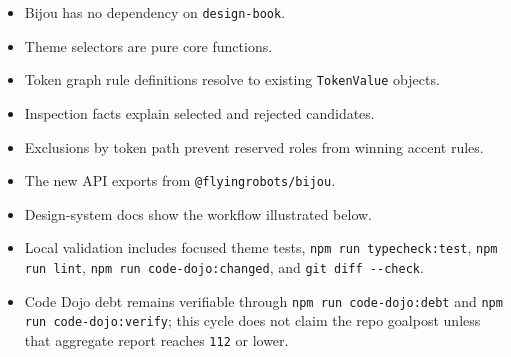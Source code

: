 \begin{itemize}
\tightlist
\item
  Bijou has no dependency on \texttt{d\allowbreak{}e\allowbreak{}s\allowbreak{}i\allowbreak{}g\allowbreak{}n\allowbreak{}-\allowbreak{}b\allowbreak{}o\allowbreak{}o\allowbreak{}k}.
\item
  Theme selectors are pure core functions.
\item
  Token graph rule definitions resolve to existing \texttt{T\allowbreak{}o\allowbreak{}k\allowbreak{}e\allowbreak{}n\allowbreak{}V\allowbreak{}a\allowbreak{}l\allowbreak{}u\allowbreak{}e} objects.
\item
  Inspection facts explain selected and rejected candidates.
\item
  Exclusions by token path prevent reserved roles from winning accent rules.
\item
  The new API exports from \texttt{@\allowbreak{}f\allowbreak{}l\allowbreak{}y\allowbreak{}i\allowbreak{}n\allowbreak{}g\allowbreak{}r\allowbreak{}o\allowbreak{}b\allowbreak{}o\allowbreak{}t\allowbreak{}s\allowbreak{}/\allowbreak{}b\allowbreak{}i\allowbreak{}j\allowbreak{}o\allowbreak{}u}.
\item
  Design-system docs show the workflow illustrated below.
\item
  Local validation includes focused theme tests, \texttt{n\allowbreak{}p\allowbreak{}m\allowbreak{} \allowbreak{}r\allowbreak{}u\allowbreak{}n\allowbreak{} \allowbreak{}t\allowbreak{}y\allowbreak{}p\allowbreak{}e\allowbreak{}c\allowbreak{}h\allowbreak{}e\allowbreak{}c\allowbreak{}k\allowbreak{}:\allowbreak{}t\allowbreak{}e\allowbreak{}s\allowbreak{}t}, \texttt{n\allowbreak{}p\allowbreak{}m\allowbreak{} \allowbreak{}r\allowbreak{}u\allowbreak{}n\allowbreak{} \allowbreak{}l\allowbreak{}i\allowbreak{}n\allowbreak{}t}, \texttt{n\allowbreak{}p\allowbreak{}m\allowbreak{} \allowbreak{}r\allowbreak{}u\allowbreak{}n\allowbreak{} \allowbreak{}c\allowbreak{}o\allowbreak{}d\allowbreak{}e\allowbreak{}-\allowbreak{}d\allowbreak{}o\allowbreak{}j\allowbreak{}o\allowbreak{}:\allowbreak{}c\allowbreak{}h\allowbreak{}a\allowbreak{}n\allowbreak{}g\allowbreak{}e\allowbreak{}d}, and \texttt{g\allowbreak{}i\allowbreak{}t\allowbreak{} \allowbreak{}d\allowbreak{}i\allowbreak{}f\allowbreak{}f\allowbreak{} \allowbreak{}-\allowbreak{}-\allowbreak{}c\allowbreak{}h\allowbreak{}e\allowbreak{}c\allowbreak{}k}.
\item
  Code Dojo debt remains verifiable through \texttt{n\allowbreak{}p\allowbreak{}m\allowbreak{} \allowbreak{}r\allowbreak{}u\allowbreak{}n\allowbreak{} \allowbreak{}c\allowbreak{}o\allowbreak{}d\allowbreak{}e\allowbreak{}-\allowbreak{}d\allowbreak{}o\allowbreak{}j\allowbreak{}o\allowbreak{}:\allowbreak{}d\allowbreak{}e\allowbreak{}b\allowbreak{}t} and \texttt{n\allowbreak{}p\allowbreak{}m\allowbreak{} \allowbreak{}r\allowbreak{}u\allowbreak{}n\allowbreak{} \allowbreak{}c\allowbreak{}o\allowbreak{}d\allowbreak{}e\allowbreak{}-\allowbreak{}d\allowbreak{}o\allowbreak{}j\allowbreak{}o\allowbreak{}:\allowbreak{}v\allowbreak{}e\allowbreak{}r\allowbreak{}i\allowbreak{}f\allowbreak{}y}; this cycle does not claim the repo goalpost unless that aggregate report reaches \texttt{1\allowbreak{}1\allowbreak{}2} or lower.
\end{itemize}

